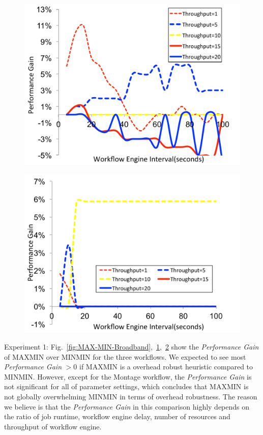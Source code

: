 \begin{figure}[!htb]
\centering
 \includegraphics[width=0.9\linewidth]{figure/MAX-MIN-CyberShake.pdf}
  \label{fig:MAX-MIN-CyberShake}
\end{figure}

\begin{figure}[!htb]
\centering
 \includegraphics[width=0.9\linewidth]{figure/MAX-MIN-Montage.pdf}
  \label{fig:MAX-MIN-Montage}
\end{figure}


Experiment 1: Fig.~\ref{fig:MAX-MIN-Broadband},~\ref{fig:MAX-MIN-CyberShake},~\ref{fig:MAX-MIN-Montage} show the  \emph{Performance Gain} of MAXMIN over MINMIN for the three workflows. We expected to see most  \emph{Performance Gain} $>0$ if MAXMIN is a overhead robust heuristic compared to MINMIN. However, except for the Montage workflow, the \emph{Performance Gain} is not significant for all of parameter settings, which concludes that MAXMIN is not globally overwhelming MINMIN in terms of overhead robustness. The reason we believe is that the  \emph{Performance Gain} in this comparison highly depends on the ratio of job runtime, workflow engine delay, number of resources and throughput of workflow engine. 

